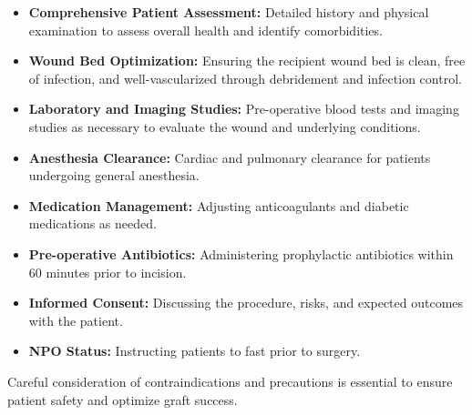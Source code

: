 \begin{itemize}
  \item \textbf{Comprehensive Patient Assessment:} Detailed history and physical examination to assess overall health and identify comorbidities.
  
  \item \textbf{Wound Bed Optimization:} Ensuring the recipient wound bed is clean, free of infection, and well-vascularized through debridement and infection control.
  
  \item \textbf{Laboratory and Imaging Studies:} Pre-operative blood tests and imaging studies as necessary to evaluate the wound and underlying conditions.
  
  \item \textbf{Anesthesia Clearance:} Cardiac and pulmonary clearance for patients undergoing general anesthesia.
  
  \item \textbf{Medication Management:} Adjusting anticoagulants and diabetic medications as needed.
  
  \item \textbf{Pre-operative Antibiotics:} Administering prophylactic antibiotics within 60 minutes prior to incision.
  
  \item \textbf{Informed Consent:} Discussing the procedure, risks, and expected outcomes with the patient.
  
  \item \textbf{NPO Status:} Instructing patients to fast prior to surgery.
\end{itemize}

Careful consideration of contraindications and precautions is essential to ensure patient safety and optimize graft success.

